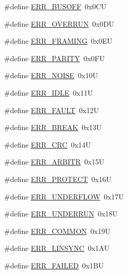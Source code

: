 \begin{DoxyCompactItemize}
\item 
\#define \hyperlink{group___p_e___error__module_ga210385b149e9e04a454830bf0776cfcf}{E\+R\+R\+\_\+\+B\+U\+S\+O\+FF}~0x0\+CU
\item 
\#define \hyperlink{group___p_e___error__module_gae74be901f0269b1eb26bdc9da203fc86}{E\+R\+R\+\_\+\+O\+V\+E\+R\+R\+UN}~0x0\+DU
\item 
\#define \hyperlink{group___p_e___error__module_ga93dabff90378a5940feeb66d540016f0}{E\+R\+R\+\_\+\+F\+R\+A\+M\+I\+NG}~0x0\+EU
\item 
\#define \hyperlink{group___p_e___error__module_ga98e764e239ae37e9a70216cc7aa4ec64}{E\+R\+R\+\_\+\+P\+A\+R\+I\+TY}~0x0\+FU
\item 
\#define \hyperlink{group___p_e___error__module_ga5b737bc2671b7207bb41b23b7edd0386}{E\+R\+R\+\_\+\+N\+O\+I\+SE}~0x10U
\item 
\#define \hyperlink{group___p_e___error__module_gaef1b4ee0b954443aaeb5c106d13bb70c}{E\+R\+R\+\_\+\+I\+D\+LE}~0x11U
\item 
\#define \hyperlink{group___p_e___error__module_ga90cb6ddc0765a1390dd484202f5169db}{E\+R\+R\+\_\+\+F\+A\+U\+LT}~0x12U
\item 
\#define \hyperlink{group___p_e___error__module_gae7143596878f82b81e311828b171034d}{E\+R\+R\+\_\+\+B\+R\+E\+AK}~0x13U
\item 
\#define \hyperlink{group___p_e___error__module_gae2f8372efd8fbf20128240c45f597109}{E\+R\+R\+\_\+\+C\+RC}~0x14U
\item 
\#define \hyperlink{group___p_e___error__module_gafd7b5442caf73be59c1917b3e9741c32}{E\+R\+R\+\_\+\+A\+R\+B\+I\+TR}~0x15U
\item 
\#define \hyperlink{group___p_e___error__module_gabf20f3e8d98667fc04b0c79ddc756edf}{E\+R\+R\+\_\+\+P\+R\+O\+T\+E\+CT}~0x16U
\item 
\#define \hyperlink{group___p_e___error__module_ga0e0f76be42ac68519b962029a71317ed}{E\+R\+R\+\_\+\+U\+N\+D\+E\+R\+F\+L\+OW}~0x17U
\item 
\#define \hyperlink{group___p_e___error__module_gad63d6a13b7456014efbf4eeeb3c3ace4}{E\+R\+R\+\_\+\+U\+N\+D\+E\+R\+R\+UN}~0x18U
\item 
\#define \hyperlink{group___p_e___error__module_ga60f7c1fa4fb4fb9ac4883eac3a7a7961}{E\+R\+R\+\_\+\+C\+O\+M\+M\+ON}~0x19U
\item 
\#define \hyperlink{group___p_e___error__module_ga0f54dc49decc242d4a14cb0b2c1099e6}{E\+R\+R\+\_\+\+L\+I\+N\+S\+Y\+NC}~0x1\+AU
\item 
\#define \hyperlink{group___p_e___error__module_gada2a13c14425d327be8414733c7e4a56}{E\+R\+R\+\_\+\+F\+A\+I\+L\+ED}~0x1\+BU

\end{DoxyCompactItemize}

